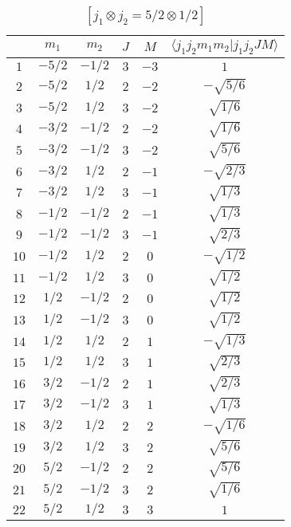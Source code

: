 \begin{table}
\tiny
\caption{$[j_1 \otimes j_2 = 5/2 \otimes 1/2]$}
\begin{center}
\begin{tabular}{|c|c|c|c|c|c|}
\hline 
   & $m_1$ & $m_2$ & $J$ & $M$ & $\langle j_1 j_2 m_1 m_2 | j_1 j_2 J M \rangle$ \\ 
\hline 
$1$ & $-5/2$ & $-1/2$ & $3$ & $-3$ & $1$ \\ 
$2$ & $-5/2$ & $1/2$ & $2$ & $-2$ & $-\sqrt{5/6}$ \\ 
$3$ & $-5/2$ & $1/2$ & $3$ & $-2$ & $\sqrt{1/6}$ \\ 
$4$ & $-3/2$ & $-1/2$ & $2$ & $-2$ & $\sqrt{1/6}$ \\ 
$5$ & $-3/2$ & $-1/2$ & $3$ & $-2$ & $\sqrt{5/6}$ \\ 
$6$ & $-3/2$ & $1/2$ & $2$ & $-1$ & $-\sqrt{2/3}$ \\ 
$7$ & $-3/2$ & $1/2$ & $3$ & $-1$ & $\sqrt{1/3}$ \\ 
$8$ & $-1/2$ & $-1/2$ & $2$ & $-1$ & $\sqrt{1/3}$ \\ 
$9$ & $-1/2$ & $-1/2$ & $3$ & $-1$ & $\sqrt{2/3}$ \\ 
$10$ & $-1/2$ & $1/2$ & $2$ & $0$ & $-\sqrt{1/2}$ \\ 
$11$ & $-1/2$ & $1/2$ & $3$ & $0$ & $\sqrt{1/2}$ \\ 
$12$ & $1/2$ & $-1/2$ & $2$ & $0$ & $\sqrt{1/2}$ \\ 
$13$ & $1/2$ & $-1/2$ & $3$ & $0$ & $\sqrt{1/2}$ \\ 
$14$ & $1/2$ & $1/2$ & $2$ & $1$ & $-\sqrt{1/3}$ \\ 
$15$ & $1/2$ & $1/2$ & $3$ & $1$ & $\sqrt{2/3}$ \\ 
$16$ & $3/2$ & $-1/2$ & $2$ & $1$ & $\sqrt{2/3}$ \\ 
$17$ & $3/2$ & $-1/2$ & $3$ & $1$ & $\sqrt{1/3}$ \\ 
$18$ & $3/2$ & $1/2$ & $2$ & $2$ & $-\sqrt{1/6}$ \\ 
$19$ & $3/2$ & $1/2$ & $3$ & $2$ & $\sqrt{5/6}$ \\ 
$20$ & $5/2$ & $-1/2$ & $2$ & $2$ & $\sqrt{5/6}$ \\ 
$21$ & $5/2$ & $-1/2$ & $3$ & $2$ & $\sqrt{1/6}$ \\ 
$22$ & $5/2$ & $1/2$ & $3$ & $3$ & $1$ \\ 
\hline 
\end{tabular}
\end{center}
\end{table}

